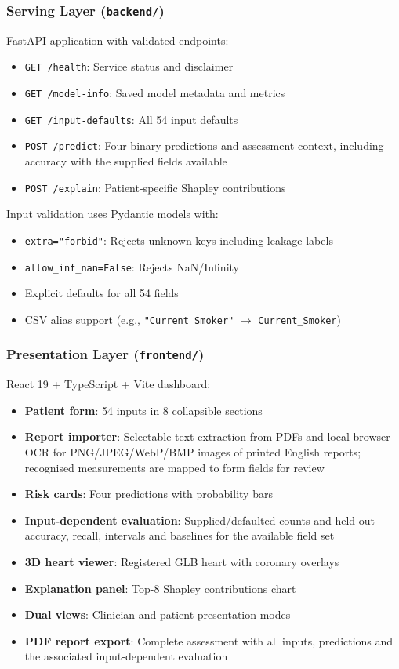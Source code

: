 \documentclass[conference]{IEEEtran}
\begin{document}
\subsubsection{Serving Layer (\texttt{backend/})}

FastAPI application with validated endpoints:
\begin{itemize}
    \item \texttt{GET /health}: Service status and disclaimer
    \item \texttt{GET /model-info}: Saved model metadata and metrics
    \item \texttt{GET /input-defaults}: All 54 input defaults
    \item \texttt{POST /predict}: Four binary predictions and assessment context, including accuracy with the supplied fields available
    \item \texttt{POST /explain}: Patient-specific Shapley contributions
\end{itemize}

Input validation uses Pydantic models with:
\begin{itemize}
    \item \texttt{extra="forbid"}: Rejects unknown keys including leakage labels
    \item \texttt{allow\_inf\_nan=False}: Rejects NaN/Infinity
    \item Explicit defaults for all 54 fields
    \item CSV alias support (e.g., \texttt{"Current Smoker"} $\rightarrow$ \texttt{Current\_Smoker})
\end{itemize}

\subsubsection{Presentation Layer (\texttt{frontend/})}

React 19 + TypeScript + Vite dashboard:
\begin{itemize}
    \item \textbf{Patient form}: 54 inputs in 8 collapsible sections
    \item \textbf{Report importer}: Selectable text extraction from PDFs and local browser OCR for PNG/JPEG/WebP/BMP images of printed English reports; recognised measurements are mapped to form fields for review
    \item \textbf{Risk cards}: Four predictions with probability bars
    \item \textbf{Input-dependent evaluation}: Supplied/defaulted counts and held-out accuracy, recall, intervals and baselines for the available field set
    \item \textbf{3D heart viewer}: Registered GLB heart with coronary overlays
    \item \textbf{Explanation panel}: Top-8 Shapley contributions chart
    \item \textbf{Dual views}: Clinician and patient presentation modes
    \item \textbf{PDF report export}: Complete assessment with all inputs, predictions and the associated input-dependent evaluation
\end{itemize}
\end{document}
